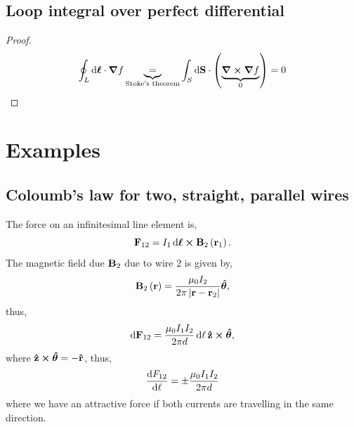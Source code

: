 \documentclass{book}
\begin{document}
\section{Loop integral over perfect differential}
\begin{proof}
	\begin{equation}
		\oint_L \dd{\vb*{\ell}} \cdot \grad f \underbrace{=}_{\text{Stoke's theorem}} \int_S \dd{\vb{S}} \cdot\left(\underbrace{\curl{\grad f}}_0\right) = 0
	\end{equation}
\end{proof}
\chapter{Examples}
\section{Coloumb's law for two, straight, parallel wires}
The force on an infinitesimal line element is,
\begin{equation}
	\vb{F}_{12} = I_1\dd{\vb*{\ell}}\cross\vb{B}_2\left(\vb{r}_1\right).
\end{equation}
The magnetic field due $\vb{B}_2$ due to wire 2 is given by,
\begin{equation}
	\vb{B}_2\left(\vb{r}\right) = \frac{\mu_0 I_2}{2\pi\left|\vb{r} - \vb{r}_2\right|}\vu*{\theta},
\end{equation}
thus,
\begin{equation}
	\dd{\vb{F}_{12}} = \frac{\mu_0 I_1I_2}{2\pi d}\dd{\ell}\vu{z}\cross\vu*{\theta},
\end{equation}
where $\vu{z}\cross\vu*{\theta} = - \vu{r}$, thus,
\begin{equation}
	\dv{F_{12}}{\ell} = \pm \frac{\mu_0 I_1I_2}{2\pi d}
\end{equation}
where we have an attractive force if both currents are travelling in the same direction.
\end{document}
